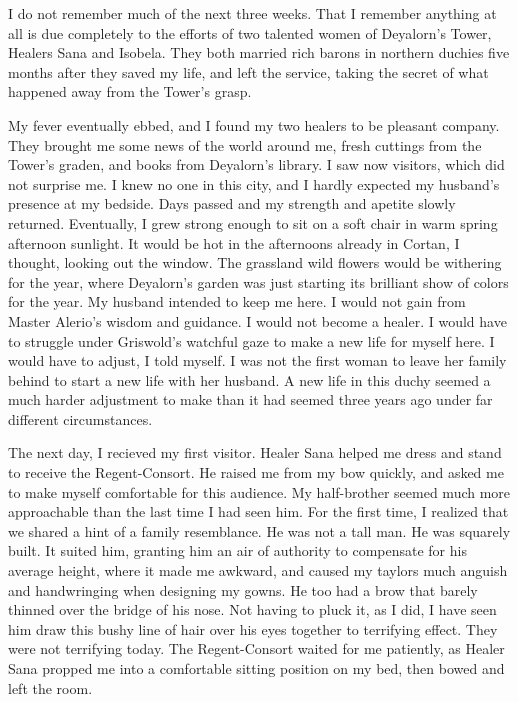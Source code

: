 \documentclass{article}
\begin{document}
\vspace{.5cm}

I do not remember much of the next three weeks. That I remember anything at all is due completely to the efforts of two talented women of Deyalorn's Tower, Healers Sana and Isobela. They both married rich barons in northern duchies five months after they saved my life, and left the service, taking the secret of what happened away from the Tower's grasp.

My fever eventually ebbed, and I found my two healers to be pleasant company. They brought me some news of the world around me, fresh cuttings from the Tower's graden, and books from Deyalorn's library. I saw now visitors, which did not surprise me. I knew no one in this city, and I hardly expected my husband's presence at my bedside. Days passed and my strength and apetite slowly returned. Eventually, I grew strong enough to sit on a soft chair in warm spring afternoon sunlight. It would be hot in the afternoons already in Cortan, I thought, looking out the window. The grassland wild flowers would be withering for the year, where Deyalorn's garden was just starting its brilliant show of colors for the year. My husband intended to keep me here. I would not gain from Master Alerio's wisdom and guidance. I would not become a healer. I would have to struggle under Griswold's watchful gaze to make a new life for myself here. I would have to adjust, I told myself. I was not the first woman to leave her family behind to start a new life with her husband. A new life in this duchy seemed a much harder adjustment to make than it had seemed three years ago under far different circumstances. 

The next day, I recieved my first visitor. Healer Sana helped me dress and stand to receive the Regent-Consort. He raised me from my bow quickly, and asked me to make myself comfortable for this audience. My half-brother seemed much more approachable than the last time I had seen him. For the first time, I realized that we shared a hint of a family resemblance. He was not a tall man. He was squarely built. It suited him, granting him an air of authority to compensate for his average height, where it made me awkward, and caused my taylors much anguish and handwringing when designing my gowns. He too had a brow that barely thinned over the bridge of his nose. Not having to pluck it, as I did, I have seen him draw this bushy line of hair over his eyes together to terrifying effect. They were not terrifying today. The Regent-Consort waited for me patiently, as Healer Sana propped me into a comfortable sitting position on my bed, then bowed and left the room. 
\end{document}
